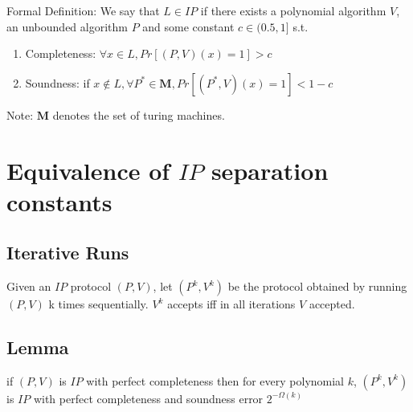 Formal Definition:
We say that $L\in IP$ if there exists a polynomial algorithm $V$, an unbounded algorithm $P$ and some constant $c\in (0.5, 1]$ s.t.
\begin{enumerate}
    \item Completeness: $\forall x\in L, Pr[(P,V)(x)=1]>c$
    \item Soundness: if $x\notin L,\forall P^*\in\mathbf{M}, Pr[(P^*,V)(x)=1]<1-c$
\end{enumerate}
Note: $\mathbf{M}$ denotes the set of turing machines.


\section{Equivalence of $IP$ separation constants}
\subsection{Iterative Runs}
Given an $IP$ protocol $(P,V)$, let $(P^k,V^k)$ be the protocol obtained by running $(P,V)$ k times sequentially. $V^k$ accepts iff in all iterations $V$ accepted.

\subsection{Lemma}
if $(P,V)$ is $IP$ with perfect completeness then for every polynomial $k$, $(P^k, V^k)$ is $IP$ with perfect completeness and soundness error $2^{-\Omega (k)}$

